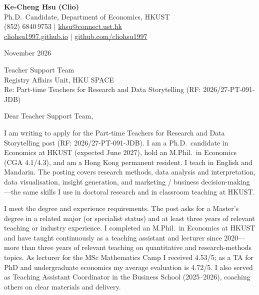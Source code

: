 \documentclass[11pt,letterpaper]{article}
\begin{document}
\noindent
{\bfseries Ke-Cheng Hsu (Clio)}\\
Ph.D.\ Candidate, Department of Economics, HKUST\\
(852) 6840\,9753 \quad $|$ \quad \href{mailto:khsu@connect.ust.hk}{khsu@connect.ust.hk}\\
\href{https://cliohsu1997.github.io/}{cliohsu1997.github.io} \quad $|$ \quad \href{https://github.com/cliohsu1997}{github.com/cliohsu1997}

\vspace{0.3em}
 November 2026

\vspace{0.2em}
\noindent
Teacher Support Team\\
Registry Affairs Unit, HKU SPACE\\
Re: Part-time Teachers for Research and Data Storytelling (RF: 2026/27-PT-091-JDB)

\vspace{0.1em}
Dear Teacher Support Team,

I am writing to apply for the Part-time Teachers for Research and Data Storytelling post (RF: 2026/27-PT-091-JDB). I am a Ph.D.\ candidate in Economics at HKUST (expected June 2027), hold an M.Phil.\ in Economics (CGA 4.1/4.3), and am a Hong Kong permanent resident. I teach in English and Mandarin. The posting covers research methods, data analysis and interpretation, data visualisation, insight generation, and marketing / business decision-making---the same skills I use in doctoral research and in classroom teaching at HKUST.

I meet the degree and experience requirements. The post asks for a Master's degree in a related major (or specialist status) and at least three years of relevant teaching or industry experience. I completed an M.Phil.\ in Economics at HKUST and have taught continuously as a teaching assistant and lecturer since 2020---more than three years of relevant teaching on quantitative and research-methods topics. As lecturer for the MSc Mathematics Camp I received 4.53/5; as a TA for PhD and undergraduate economics my average evaluation is 4.72/5. I also served as Teaching Assistant Coordinator in the Business School (2025--2026), coaching others on clear materials and delivery.
\end{document}

